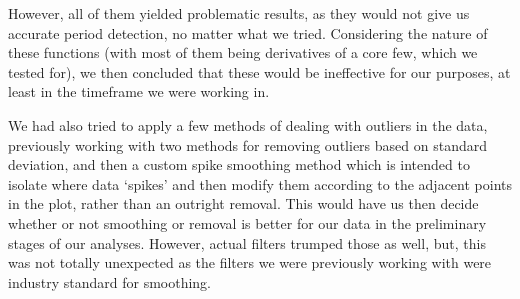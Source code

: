 \documentclass[conference]{IEEEtran}
\begin{document}
However, all of them yielded problematic results, as they would not give us accurate period detection, no matter what we tried. Considering the nature of these functions (with most of them being derivatives of a core few, which we tested for), we then concluded that these would be ineffective for our purposes, at least in the timeframe we were working in.

We had also tried to apply a few methods of dealing with outliers in the data, previously working with two methods for removing outliers based on standard deviation, and then a custom spike smoothing method which is intended to isolate where data ‘spikes’ and then modify them according to the adjacent points in the plot, rather than an outright removal. This would have us then decide whether or not smoothing or removal is better for our data in the preliminary stages of our analyses. However, actual filters trumped those as well, but, this was not totally unexpected as the filters we were previously working with were industry standard for smoothing. 
\end{document}
